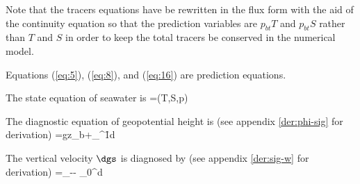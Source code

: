 Note that the tracers
equations have be rewritten in the flux form with the aid of the continuity
equation so that the prediction variables are $p_{bt}T$ and $p_{bt}S$
rather than $T$ and $S$ in order to keep the total tracers be conserved
in the numerical model.

Equations (\ref{eq:5}), (\ref{eq:8}), and (\ref{eq:16}) are prediction equations.

The state equation of seawater is
\beeq \label{eq:17}
\rho=\rho(T,S,p)
\eneq
 
The diagnostic equation of geopotential height is (see appendix
\ref{der:phi-sig} for derivation)
\beeq \label{eq:18}
\phi=gz_{b}+\int_{\gs}^{1}\f{\pbt}{\rho}d\gs
\eneq
 
The vertical velocity $\dgs$ is diagnosed by
(see appendix \ref{der:sig-w} for derivation)
\beeq \label{eq:19}
\pbt\dgs=\grp{\pbt\dgs}_{}-\gs{}-
\racosf\int_{0}^{\gs}d\gs
\eneq

